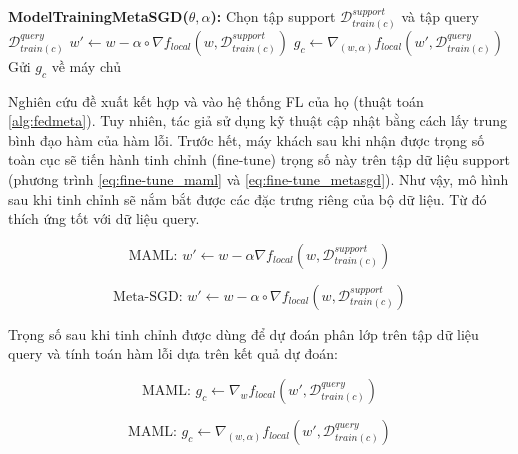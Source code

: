 \begin{algorithm}[H]
\begin{algorithmic}[1]
        \State

        \State\textbf{ModelTrainingMetaSGD($\theta, \alpha$):}
        \State Chọn tập support $\mathcal{D}_{train(c)}^{support}$ và tập query $\mathcal{D}_{train(c)}^{query}$
        \State $w' \gets w - \alpha \circ \nabla f_{local}(w, \mathcal{D}_{train(c)}^{support})$
        \State $g_c \gets \nabla_{(w,\alpha)} f_{local}(w', \mathcal{D}_{train(c)}^{query})$
        \State Gửi $g_c$ về máy chủ
    \end{algorithmic}
\end{algorithm}

Nghiên cứu \cite{chen2018federated} đề xuất kết hợp  và  vào hệ thống FL của họ (thuật toán \ref{alg:fedmeta}). Tuy nhiên, tác giả sử dụng kỹ thuật cập nhật bằng cách lấy trung bình đạo hàm của hàm lỗi. Trước hết, máy khách sau khi nhận được trọng số toàn cục sẽ tiến hành tinh chỉnh (fine-tune) trọng số này trên tập dữ liệu support (phương trình \ref{eq:fine-tune_maml} và \ref{eq:fine-tune_metasgd}). Như vậy, mô hình sau khi tinh chỉnh sẽ nắm bắt được các đặc trưng riêng của bộ dữ liệu. Từ đó thích ứng tốt với dữ liệu query.

\begin{dmath}
    \label{eq:fine-tune_maml}
    \text{MAML: }w' \gets w - \alpha\nabla f_{local}(w, \mathcal{D}_{train(c)}^{support})
\end{dmath}

\begin{dmath}
    \label{eq:fine-tune_metasgd}
    \text{Meta-SGD: }w' \gets w - \alpha \circ \nabla f_{local}(w, \mathcal{D}_{train(c)}^{support})
\end{dmath}

Trọng số sau khi tinh chỉnh được dùng để dự đoán phân lớp trên tập dữ liệu query và tính toán hàm lỗi dựa trên kết quả dự đoán:

\begin{dmath}
    \label{eq:grad_maml}
    \text{MAML: }g_c \gets \nabla_w f_{local}(w', \mathcal{D}_{train(c)}^{query})
\end{dmath}

\begin{dmath}
    \label{eq:grad_metasgd}
    \text{MAML: }g_c \gets \nabla_{(w,\alpha)} f_{local}(w', \mathcal{D}_{train(c)}^{query})
\end{dmath}

